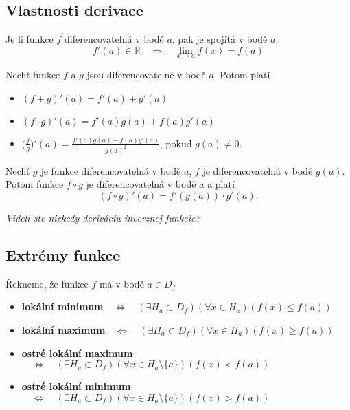 \subsection{Vlastnosti derivace}

\theorem Je li funkce $f$ diferencovatelná v bodě $a$, pak je spojitá v bodě $a$.
$$
	f'(a)\in\mathbb{R} \quad\Rightarrow\quad \lim_{x\rightarrow a} f(x)=f(a)
$$

 Nechť funkce $f$ a $g$ jsou diferencovatelné v bodě $a$. Potom platí
\vspace{-5pt}
\begin{itemize}
	\item $(f+g)'(a) = f'(a) + g'(a)$
	\item $ (f\cdot g)'(a) = f'(a)g(a) + f(a)g'(a)$
	\item $\big( \frac{f}{g} \big)'(a) = \frac{f'(a)g(a)-f(a)g'(a)}{g(a)^2}$, pokud $g(a)\neq0$.
\end{itemize}
\vspace{-5pt}

 Nechť $g$ je funkce diferencovatelná v bodě $a$, $f$ je diferencovatelná v bodě $g(a)$. Potom funkce $f \circ g$ je diferencovatelná v bodě $a$ a platí
$$
	(f\circ g)'(a) = f'(g(a))\cdot g'(a).
$$

\textit{Videli ste niekedy deriváciu inverznej funkcie?}

\subsection{Extrémy funkce}

 Řekneme, že funkce $f$ má v bodě $a \in D_f$
\vspace{-5pt}
\begin{itemize}
	\item\textbf{lokální minimum}$\quad\Leftrightarrow\quad (\exists H_a\subset D_f)(\forall x\in H_a)(f(x)\leq f(a)) $
	\item\textbf{lokální maximum}$\quad\Leftrightarrow\quad (\exists H_a\subset D_f)(\forall x\in H_a)(f(x)\geq f(a)) $
	\item\textbf{ostré lokální maximum}$\quad\Leftrightarrow\quad (\exists H_a\subset D_f)(\forall x\in H_a\setminus \{a\})(f(x)< f(a)) $
	\item\textbf{ostré lokální minimum}$\quad\Leftrightarrow\quad (\exists H_a\subset D_f)(\forall x\in H_a\setminus \{a\})(f(x)> f(a)) $
\end{itemize}
\vspace{-5pt}

